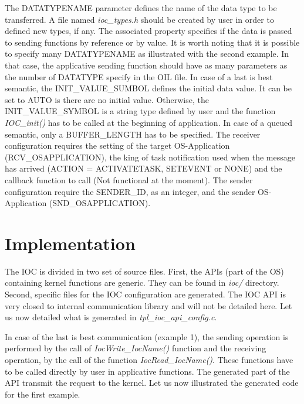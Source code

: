 The DATATYPENAME parameter defines the name of the data type to be transferred. A file named \textit{ioc_types.h} should be created by user in order to defined new types, if any. The associated property specifies if the data is passed to sending functions by reference or by value. It is worth noting that it is possible to specify many DATATYPENAME as illustrated with the second example. In that case, the applicative sending function should have as many parameters as the number of DATATYPE specify in the OIL file. 
In case of a last is best semantic, the INIT_VALUE_SUMBOL defines the initial data value. It can be set to AUTO is there are no initial value. Otherwise, the INIT_VALUE_SYMBOL is a string type defined by user and the function \textit{IOC_init()} has to be called at the beginning of application. In case of a queued semantic, only a BUFFER_LENGTH has to be specified.
The receiver configuration requires the setting of the target OS-Application (RCV_OSAPPLICATION), the king of task notification used when the message has arrived (ACTION = ACTIVATETASK, SETEVENT or NONE) and the callback function to call (Not functional at the moment).
The sender configuration require the SENDER_ID, as an integer, and the sender OS-Application (SND_OSAPPLICATION). 

\section{Implementation}

The IOC is divided in two set of source files. First, the APIs (part of the OS) containing kernel functions are generic. They can be found in \textit{ioc/} directory. Second, specific files for the IOC configuration are generated. The IOC API is very closed to internal communication library and will not be detailed here. Let us now detailed what is generated in \textit{tpl_ioc_api_config.c}.

In case of the last is best communication (example 1), the sending operation is performed by the call of \textit{IocWrite_IocName()} function and the receiving operation, by the call of the function \textit{IocRead_IocName()}. These functions have to be called directly by user in applicative functions. The generated part of the API transmit the request to the kernel. Let us now illustrated the generated code for the first example.

